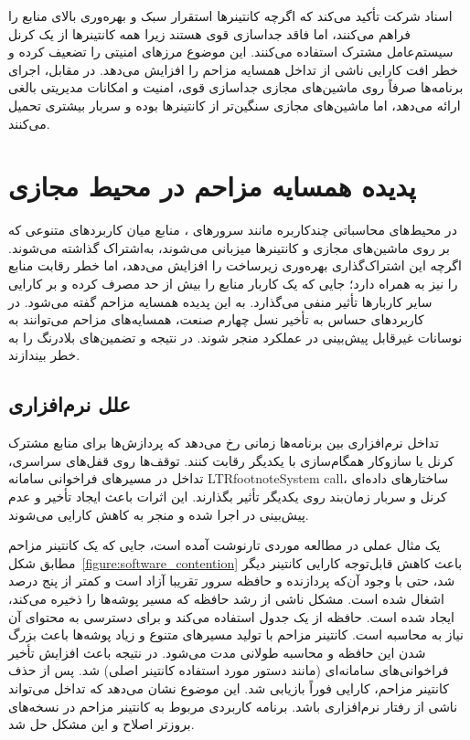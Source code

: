 اسناد شرکت  تأکید می‌کند\cite{vmware_whitepaper} که اگرچه کانتینرها استقرار سبک و بهره‌وری بالای منابع را فراهم می‌کنند، اما فاقد جداسازی قوی هستند زیرا همه کانتینرها از یک کرنل سیستم‌عامل مشترک استفاده می‌کنند. این موضوع مرزهای امنیتی را تضعیف کرده و خطر افت کارایی ناشی از تداخل همسایه‌ مزاحم را افزایش می‌دهد. در مقابل، اجرای برنامه‌ها صرفاً روی ماشین‌های مجازی جداسازی قوی، امنیت و امکانات مدیریتی بالغی ارائه می‌دهد، اما ماشین‌های مجازی سنگین‌تر از کانتینرها بوده و سربار بیشتری تحمیل می‌کنند.

\section{پدیده همسایه مزاحم در محیط مجازی}

در محیط‌های محاسباتی چندکاربره مانند سرورهای ، منابع میان کاربردهای متنوعی که بر روی ماشین‌های مجازی و کانتینرها میزبانی می‌شوند، به‌اشتراک گذاشته می‌شوند. اگرچه این اشتراک‌گذاری بهره‌وری زیرساخت را افزایش می‌دهد، اما خطر رقابت منابع را نیز به همراه دارد؛ جایی که یک کاربار منابع را بیش از حد مصرف کرده و بر کارایی سایر کاربارها تأثیر منفی می‌گذارد. به این پدیده همسایه مزاحم گفته می‌شود. در کاربردهای حساس به تأخیر نسل چهارم صنعت، همسایه‌های مزاحم می‌توانند به نوسانات غیرقابل پیش‌بینی در عملکرد منجر شوند. در نتیجه  و تضمین‌های بلادرنگ را به خطر بیندازند.

\subsection{علل نرم‌افزاری}

تداخل نرم‌افزاری بین برنامه‌ها زمانی رخ می‌دهد که پردازش‌ها برای منابع مشترک کرنل یا سازوکار همگام‌سازی با یکدیگر رقابت کنند. توقف‌ها روی قفل‌های سراسری، تداخل در مسیرهای فراخوانی سامانه LTRfootnote{System call}، ساختارهای داده‌ای کرنل و سربار زمان‌بند روی یکدیگر تأثیر بگذارند. این اثرات باعث ایجاد تأخیر و عدم پیش‌بینی در اجرا شده و منجر به کاهش کارایی می‌شوند.

یک مثال عملی در مطالعه موردی تارنوشت  آمده است\cite{sysdig2017isolation}، جایی که یک کانتینر مزاحم مطابق شکل~\ref{figure:software_contention} باعث کاهش قابل‌توجه کارایی کانتینر دیگر شد، حتی با وجود آن‌که پردازنده و حافظه سرور تقریبا آزاد است و کمتر از پنج درصد اشغال شده است. مشکل ناشی از رشد حافظه  که مسیر پوشه‌ها را ذخیره‌ می‌کند، ایجاد شده است. حافظه  از یک جدول  استفاده می‌کند و برای دسترسی به محتوای آن نیاز به محاسبه  است. کانتینر مزاحم با تولید مسیرهای متنوع و زیاد پوشه‌ها باعث بزرگ شدن این حافظه و محاسبه طولانی مدت  می‌شود. در نتیجه باعث افزایش تأخیر فراخوانی‌های سامانه‌ای (مانند دستور  مورد استفاده کانتینر اصلی) شد. پس از حذف کانتینر مزاحم، کارایی فوراً بازیابی شد. این موضوع نشان می‌دهد که تداخل می‌تواند ناشی از رفتار نرم‌افزاری باشد. برنامه کاربردی مربوط به کانتینر مزاحم در نسخه‌های بروز‌تر اصلاح و این مشکل حل شد.

